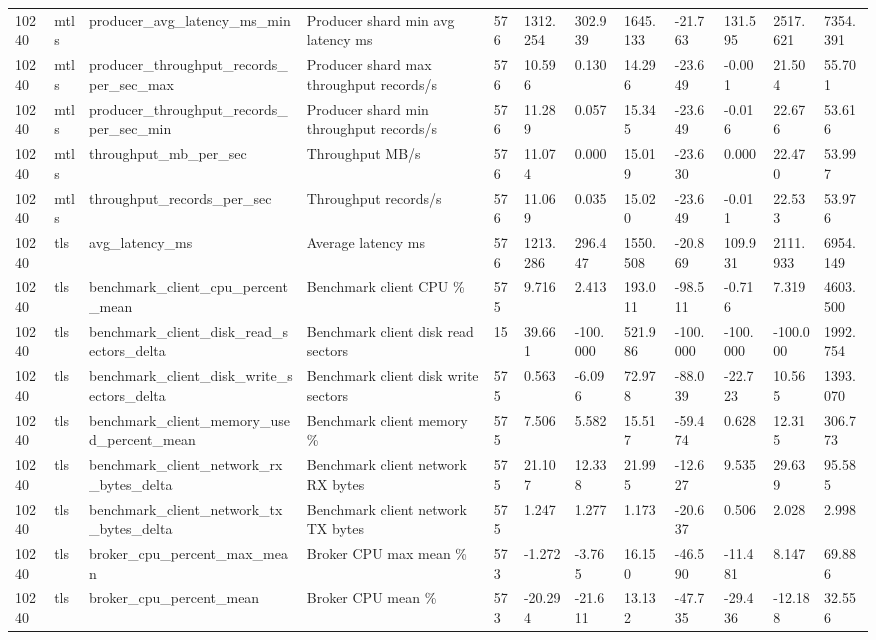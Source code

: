 \begin{longtable}{llllllllllll}
10240 & mtls & producer\_avg\_latency\_ms\_min & Producer shard min avg latency ms & 576 & 1312.254 & 302.939 & 1645.133 & -21.763 & 131.595 & 2517.621 & 7354.391 \\
10240 & mtls & producer\_throughput\_records\_per\_sec\_max & Producer shard max throughput records/s & 576 & 10.596 & 0.130 & 14.296 & -23.649 & -0.001 & 21.504 & 55.701 \\
10240 & mtls & producer\_throughput\_records\_per\_sec\_min & Producer shard min throughput records/s & 576 & 11.289 & 0.057 & 15.345 & -23.649 & -0.016 & 22.676 & 53.616 \\
10240 & mtls & throughput\_mb\_per\_sec & Throughput MB/s & 576 & 11.074 & 0.000 & 15.019 & -23.630 & 0.000 & 22.470 & 53.997 \\
10240 & mtls & throughput\_records\_per\_sec & Throughput records/s & 576 & 11.069 & 0.035 & 15.020 & -23.649 & -0.011 & 22.533 & 53.976 \\
10240 & tls & avg\_latency\_ms & Average latency ms & 576 & 1213.286 & 296.447 & 1550.508 & -20.869 & 109.931 & 2111.933 & 6954.149 \\
10240 & tls & benchmark\_client\_cpu\_percent\_mean & Benchmark client CPU \% & 575 & 9.716 & 2.413 & 193.011 & -98.511 & -0.716 & 7.319 & 4603.500 \\
10240 & tls & benchmark\_client\_disk\_read\_sectors\_delta & Benchmark client disk read sectors & 15 & 39.661 & -100.000 & 521.986 & -100.000 & -100.000 & -100.000 & 1992.754 \\
10240 & tls & benchmark\_client\_disk\_write\_sectors\_delta & Benchmark client disk write sectors & 575 & 0.563 & -6.096 & 72.978 & -88.039 & -22.723 & 10.565 & 1393.070 \\
10240 & tls & benchmark\_client\_memory\_used\_percent\_mean & Benchmark client memory \% & 575 & 7.506 & 5.582 & 15.517 & -59.474 & 0.628 & 12.315 & 306.773 \\
10240 & tls & benchmark\_client\_network\_rx\_bytes\_delta & Benchmark client network RX bytes & 575 & 21.107 & 12.338 & 21.995 & -12.627 & 9.535 & 29.639 & 95.585 \\
10240 & tls & benchmark\_client\_network\_tx\_bytes\_delta & Benchmark client network TX bytes & 575 & 1.247 & 1.277 & 1.173 & -20.637 & 0.506 & 2.028 & 2.998 \\
10240 & tls & broker\_cpu\_percent\_max\_mean & Broker CPU max mean \% & 573 & -1.272 & -3.765 & 16.150 & -46.590 & -11.481 & 8.147 & 69.886 \\
10240 & tls & broker\_cpu\_percent\_mean & Broker CPU mean \% & 573 & -20.294 & -21.611 & 13.132 & -47.735 & -29.436 & -12.188 & 32.556 \\

\end{longtable}
